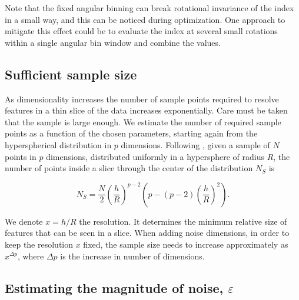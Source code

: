 \documentclass[]{interact}
\theoremstyle{plain}%
\theoremstyle{definition}
\theoremstyle{remark}
\begin{document}
Note that the fixed angular binning can break rotational invariance of
the index in a small way, and this can be noticed during optimization.
One approach to mitigate this effect could be to evaluate the index at
several small rotations within a single angular bin window and combine
the values.

\hypertarget{sufficient-sample-size}{%
\subsection{Sufficient sample size}\label{sufficient-sample-size}}

As dimensionality increases the number of sample points required to
resolve features in a thin slice of the data increases exponentially.
Care must be taken that the sample is large enough. We estimate the
number of required sample points as a function of the chosen parameters,
starting again from the hyperspherical distribution in \(p\) dimensions.
Following \citet{laa2019slice}, given a sample of \(N\) points in \(p\)
dimensions, distributed uniformly in a hypersphere of radius \(R\), the
number of points inside a slice through the center of the distribution
\(N_S\) is

\begin{equation}
N_S = \frac{N}{2} \left(\frac{h}{R}\right)^{p-2} \left(p - (p-2)\left(\frac{h}{R}\right)^{2}\right).
\label{eq:count}
\end{equation}

\noindent We denote \(x=h/R\) the resolution. It determines the minimum
relative size of features that can be seen in a slice. When adding noise
dimensions, in order to keep the resolution \(x\) fixed, the sample size
needs to increase approximately as \(x^{\Delta p}\), where \(\Delta p\)
is the increase in number of dimensions.

\hypertarget{estimating-the-magnitude-of-noise-varepsilon}{%
\subsection{\texorpdfstring{Estimating the magnitude of noise,
\(\varepsilon\)
\label{sec:epsilon}}{Estimating the magnitude of noise, \textbackslash{}varepsilon }}\label{estimating-the-magnitude-of-noise-varepsilon}}
\end{document}
